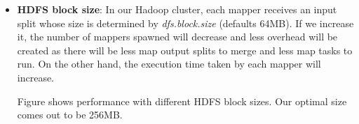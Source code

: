 \begin{itemize}
\item \textbf{HDFS block size}: In our Hadoop cluster, each mapper receives an input split whose size is determined by \textit{dfs.block.size} (defaults 64MB). If we increase it, the number of mappers spawned will decrease and less overhead will be created as there will be less map output splits to merge and less map tasks to run. On the other hand, the execution time taken by each mapper will increase. 
\par
Figure  shows performance with different HDFS block sizes. Our optimal size comes out to be 256MB.





\end{itemize}
